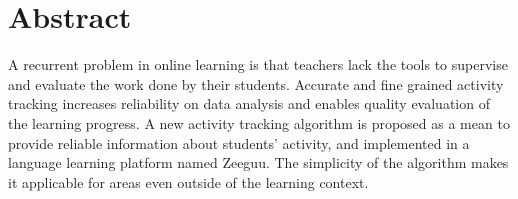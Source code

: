 \begingroup
\let\clearpage\relax
\let\cleardoublepage\relax
\let\cleardoublepage\relax

\chapter*{Abstract}
A recurrent problem in online learning is that teachers lack the tools to supervise and evaluate the work done by their students. Accurate and fine grained activity tracking increases reliability on data analysis and enables quality evaluation of the learning progress. A new activity tracking algorithm is proposed as a mean to provide reliable information about students' activity, and implemented in a language learning platform named Zeeguu. The simplicity of the algorithm makes it applicable for areas even outside of the learning context.




\vfill
%

\endgroup

\vfill

